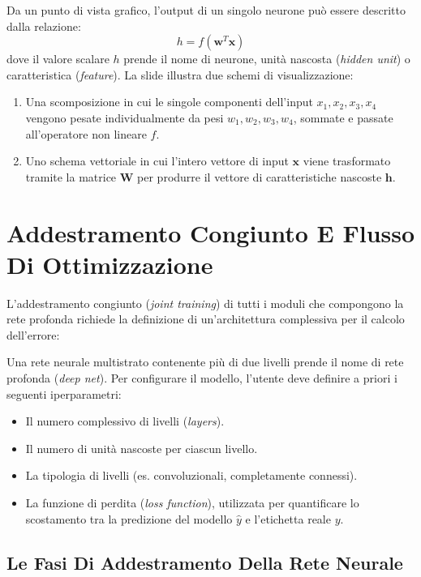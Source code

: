 ﻿\documentclass[11pt, a4paper]{article}
\begin{document}
Da un punto di vista grafico, l'output di un singolo neurone può essere descritto dalla relazione:
\[ h = f\left(\bm{w}^T\bm{x}\right) \]
dove il valore scalare $h$ prende il nome di neurone, unità nascosta (\emph{hidden unit}) o caratteristica (\emph{feature}). La slide illustra due schemi di visualizzazione:
\begin{enumerate}
    \item Una scomposizione in cui le singole componenti dell'input $x_1, x_2, x_3, x_4$ vengono pesate individualmente da pesi $w_1, w_2, w_3, w_4$, sommate e passate all'operatore non lineare $f$.
    \item Uno schema vettoriale in cui l'intero vettore di input $\bm{x}$ viene trasformato tramite la matrice $\bm{W}$ per produrre il vettore di caratteristiche nascoste $\bm{h}$.
\end{enumerate}

\newpage

\section{Addestramento Congiunto E Flusso Di Ottimizzazione}

L'addestramento congiunto (\emph{joint training}) di tutti i moduli che compongono la rete profonda richiede la definizione di un'architettura complessiva per il calcolo dell'errore:


Una rete neurale multistrato contenente più di due livelli prende il nome di rete profonda (\emph{deep net}). Per configurare il modello, l'utente deve definire a priori i seguenti iperparametri:
\begin{itemize}[noitemsep]
    \item Il numero complessivo di livelli (\emph{layers}).
    \item Il numero di unità nascoste per ciascun livello.
    \item La tipologia di livelli (es. convoluzionali, completamente connessi).
    \item La funzione di perdita (\emph{loss function}), utilizzata per quantificare lo scostamento tra la predizione del modello $\hat{y}$ e l'etichetta reale $y$.
\end{itemize}

\subsection{Le Fasi Di Addestramento Della Rete Neurale}
\end{document}
